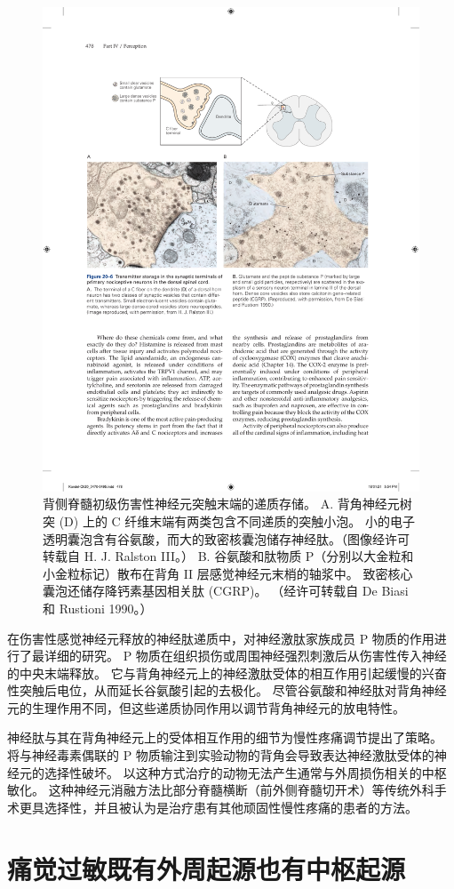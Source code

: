 \begin{figure}[htbp]
	\centering
	\includegraphics[width=0.7\linewidth]{chap20/fig_20_6}
	\caption{背侧脊髓初级伤害性神经元突触末端的递质存储。
		A. 背角神经元树突 (D) 上的 C 纤维末端有两类包含不同递质的突触小泡。
		小的电子透明囊泡含有谷氨酸，而大的致密核囊泡储存神经肽。（图像经许可转载自 H. J. Ralston III。）
		B. 谷氨酸和肽物质 P（分别以大金粒和小金粒标记）散布在背角 II 层感觉神经元末梢的轴浆中。
		致密核心囊泡还储存降钙素基因相关肽 (CGRP)。 （经许可转载自 De Biasi 和 Rustioni 1990。）}
	\label{fig:20_6}
\end{figure}


在伤害性感觉神经元释放的神经肽递质中，对神经激肽家族成员 P 物质的作用进行了最详细的研究。
P 物质在组织损伤或周围神经强烈刺激后从伤害性传入神经的中央末端释放。
它与背角神经元上的神经激肽受体的相互作用引起缓慢的兴奋性突触后电位，从而延长谷氨酸引起的去极化。
尽管谷氨酸和神经肽对背角神经元的生理作用不同，但这些递质协同作用以调节背角神经元的放电特性。


神经肽与其在背角神经元上的受体相互作用的细节为慢性疼痛调节提出了策略。
将与神经毒素偶联的 P 物质输注到实验动物的背角会导致表达神经激肽受体的神经元的选择性破坏。
以这种方式治疗的动物无法产生通常与外周损伤相关的中枢敏化。
这种神经元消融方法比部分脊髓横断（前外侧脊髓切开术）等传统外科手术更具选择性，并且被认为是治疗患有其他顽固性慢性疼痛的患者的方法。



\section{痛觉过敏既有外周起源也有中枢起源}

